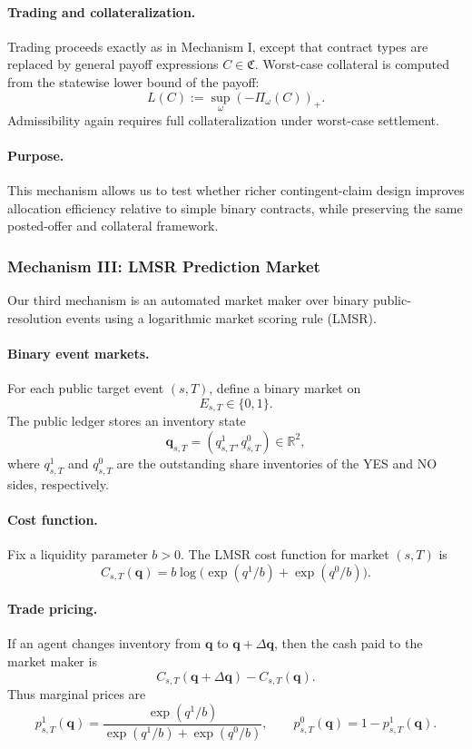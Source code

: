 \documentclass[letterpaper]{article} %
\begin{document}
\paragraph{Trading and collateralization.}
Trading proceeds exactly as in Mechanism I, except that contract types are replaced by general payoff expressions $C\in\mathfrak C$. Worst-case collateral is computed from the statewise lower bound of the payoff:
\[
L(C):=\sup_\omega(-\Pi_\omega(C))_+.
\]
Admissibility again requires full collateralization under worst-case settlement.

\paragraph{Purpose.}
This mechanism allows us to test whether richer contingent-claim design improves allocation efficiency relative to simple binary contracts, while preserving the same posted-offer and collateral framework.


\subsubsection{Mechanism III: LMSR Prediction Market}

Our third mechanism is an automated market maker over binary public-resolution events using a logarithmic market scoring rule (LMSR).

\paragraph{Binary event markets.}
For each public target event $(s,T)$, define a binary market on
\[
E_{s,T}\in\{0,1\}.
\]
The public ledger stores an inventory state
\[
\mathbf q_{s,T}=(q^1_{s,T},q^0_{s,T})\in\mathbb R^2,
\]
where $q^1_{s,T}$ and $q^0_{s,T}$ are the outstanding share inventories of the YES and NO sides, respectively.

\paragraph{Cost function.}
Fix a liquidity parameter $b>0$. The LMSR cost function for market $(s,T)$ is
\[
C_{s,T}(\mathbf q)
=
b\log\!\Big(\exp(q^1/b)+\exp(q^0/b)\Big).
\]

\paragraph{Trade pricing.}
If an agent changes inventory from $\mathbf q$ to $\mathbf q+\Delta \mathbf q$, then the cash paid to the market maker is
\[
C_{s,T}(\mathbf q+\Delta \mathbf q)-C_{s,T}(\mathbf q).
\]
Thus marginal prices are
\[
p^1_{s,T}(\mathbf q)
=
\frac{\exp(q^1/b)}{\exp(q^1/b)+\exp(q^0/b)},
\qquad
p^0_{s,T}(\mathbf q)=1-p^1_{s,T}(\mathbf q).
\]
\end{document}
